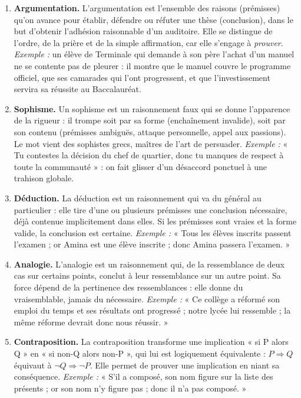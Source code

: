\documentclass[11pt]{article}
\newcommand{\cle}[1]{{\popxbold\color{popdark}#1}}
\begin{document}
\begin{corrige}
\begin{enumerate}
\item \textbf{\cle{Argumentation}.} L'argumentation est l'ensemble des raisons (prémisses) qu'on avance pour établir, défendre ou réfuter une thèse (conclusion), dans le but d'obtenir l'adhésion raisonnable d'un auditoire. Elle se distingue de l'ordre, de la prière et de la simple affirmation, car elle s'engage à \emph{prouver}. \emph{Exemple :} un élève de Terminale qui demande à son père l'achat d'un manuel ne se contente pas de pleurer : il montre que le manuel couvre le programme officiel, que ses camarades qui l'ont progressent, et que l'investissement servira sa réussite au Baccalauréat.
\item \textbf{\cle{Sophisme}.} Un sophisme est un raisonnement faux qui se donne l'apparence de la rigueur : il trompe soit par sa forme (enchaînement invalide), soit par son contenu (prémisses ambiguës, attaque personnelle, appel aux passions). Le mot vient des sophistes grecs, maîtres de l'art de persuader. \emph{Exemple :} « Tu contestes la décision du chef de quartier, donc tu manques de respect à toute la communauté » : on fait glisser d'un désaccord ponctuel à une trahison globale.
\item \textbf{\cle{Déduction}.} La déduction est un raisonnement qui va du général au particulier : elle tire d'une ou plusieurs prémisses une conclusion nécessaire, déjà contenue implicitement dans elles. Si les prémisses sont vraies et la forme valide, la conclusion est certaine. \emph{Exemple :} « Tous les élèves inscrits passent l'examen ; or Amina est une élève inscrite ; donc Amina passera l'examen. »
\item \textbf{\cle{Analogie}.} L'analogie est un raisonnement qui, de la ressemblance de deux cas sur certains points, conclut à leur ressemblance sur un autre point. Sa force dépend de la pertinence des ressemblances : elle donne du vraisemblable, jamais du nécessaire. \emph{Exemple :} « Ce collège a réformé son emploi du temps et ses résultats ont progressé ; notre lycée lui ressemble ; la même réforme devrait donc nous réussir. »
\item \textbf{\cle{Contraposition}.} La contraposition transforme une implication « si P alors Q » en « si non-Q alors non-P », qui lui est logiquement équivalente : $P \Rightarrow Q$ équivaut à $\neg Q \Rightarrow \neg P$. Elle permet de prouver une implication en niant sa conséquence. \emph{Exemple :} « S'il a composé, son nom figure sur la liste des présents ; or son nom n'y figure pas ; donc il n'a pas composé. »
\end{enumerate}
\end{corrige}
\end{document}
